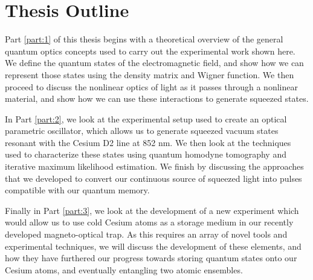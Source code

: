  

\newpage
\section*{Thesis Outline}

Part \ref{part:1} of this thesis begins with a theoretical overview of the
general quantum optics concepts used to carry out the experimental work shown here.  We define the quantum states of the electromagnetic field, and show how we can represent those states using the density matrix and Wigner function.  We then proceed to discuss the nonlinear optics of light as it passes through a nonlinear material, and show how we can use these interactions to generate squeezed states.

In Part \ref{part:2}, we look at the experimental setup used to create an optical parametric oscillator, which allows us to generate squeezed vacuum states resonant with the Cesium D2 line at 852 nm.  We then look at the techniques used to characterize these states using quantum homodyne tomography and iterative maximum likelihood estimation.  We finish by discussing the approaches that we developed to convert our continuous source of squeezed light into pulses compatible with our quantum memory.

Finally in Part \ref{part:3}, we look at the development of a new experiment which would allow us to use cold Cesium atoms as a storage medium in our recently developed magneto-optical trap.  As this requires an array of novel tools and experimental techniques, we will discuss the development of these elements, and how they have furthered our progress towards storing quantum states onto our Cesium atoms, and eventually entangling two atomic ensembles.

